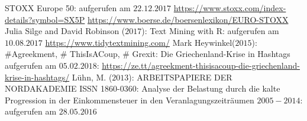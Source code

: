 
	\newpage
	\begin{thebibliography}{12345678}
	 STOXX Europe 50: aufgerufen am $22.12.2017$ \url{https://www.stoxx.com/index-details?symbol=SX5P}
	  \url{https://www.boerse.de/boersenlexikon/EURO-STOXX}	
	Julia Silge and David Robinson ($2017$): Text Mining with R: aufgerufen am $10.08.2017$ \url{https://www.tidytextmining.com/}
	 Mark Heywinkel($2015$): \#Agreekment, \# ThisIsACoup, \# Grexit: Die Griechenland-Krise in Hashtags
	aufgerufen am $05.02.2018$:  \url{https://ze.tt/agreekment-thisisacoup-die-griechenland-krise-in-hashtags/}
	 Lühn, M. ($2013$): ARBEITSPAPIERE DER NORDAKADEMIE ISSN 1860-0360: Analyse der Belastung durch die kalte Progression in der Einkommensteuer in den Veranlagungszeiträumen $2005-2014$: aufgerufen am $28.05.2016$ %
\end{thebibliography}
\clearpage